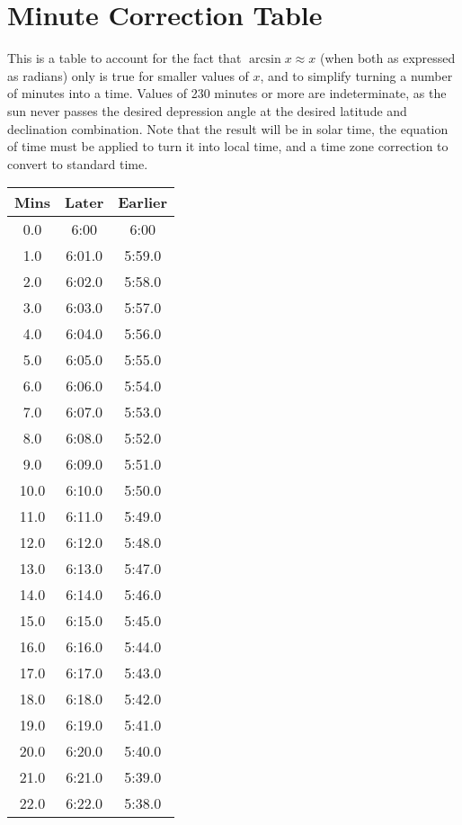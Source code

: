 \section{Minute Correction Table}

This is a table to account for the fact that $\arcsin x \approx x$ (when both as expressed as radians) only is true for smaller values of $x$, and to simplify turning a number of minutes into a time. Values of 230 minutes or more are indeterminate, as the sun never passes the desired depression angle at the desired latitude and declination combination. Note that the result will be in solar time, the equation of time must be applied to turn it into local time, and a time zone correction to convert to standard time.

\begin{footnotesize}
	\begin{minipage}{0.25\textwidth}	
\begin{tabular}[t]{c|c|c}
	Mins&Later&Earlier\\\hline
	0.0&6:00&6:00\\\hline
	1.0&6:01.0&5:59.0\\\hline
	2.0&6:02.0&5:58.0\\\hline
	3.0&6:03.0&5:57.0\\\hline
	4.0&6:04.0&5:56.0\\\hline
	5.0&6:05.0&5:55.0\\\hline
	6.0&6:06.0&5:54.0\\\hline
	7.0&6:07.0&5:53.0\\\hline
	8.0&6:08.0&5:52.0\\\hline
	9.0&6:09.0&5:51.0\\\hline
	10.0&6:10.0&5:50.0\\\hline
	11.0&6:11.0&5:49.0\\\hline
	12.0&6:12.0&5:48.0\\\hline
	13.0&6:13.0&5:47.0\\\hline
	14.0&6:14.0&5:46.0\\\hline
	15.0&6:15.0&5:45.0\\\hline
	16.0&6:16.0&5:44.0\\\hline
	17.0&6:17.0&5:43.0\\\hline
	18.0&6:18.0&5:42.0\\\hline
	19.0&6:19.0&5:41.0\\\hline
	20.0&6:20.0&5:40.0\\\hline
	21.0&6:21.0&5:39.0\\\hline
	22.0&6:22.0&5:38.0\\\hline

\end{tabular}
\end{minipage}
\end{footnotesize}
